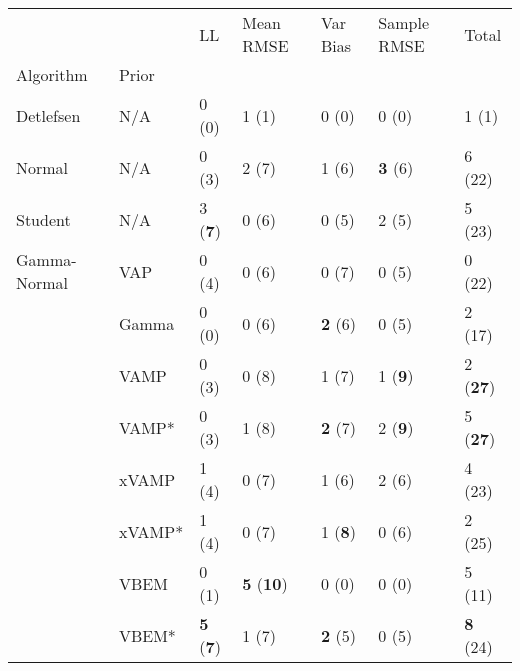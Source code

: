\begin{tabular}{lllllll}
\toprule
             &       &                       LL &                 Mean RMSE &        Var Bias &     Sample RMSE &            Total \\
Algorithm & Prior &                          &                           &                 &                 &                  \\
\midrule
Detlefsen & N/A &                    0 (0) &                     1 (1) &           0 (0) &           0 (0) &            1 (1) \\
Normal & N/A &                    0 (3) &                     2 (7) &           1 (6) &  \textbf{3} (6) &           6 (22) \\
Student & N/A &           3 (\textbf{7}) &                     0 (6) &           0 (5) &           2 (5) &           5 (23) \\
Gamma-Normal & VAP &                    0 (4) &                     0 (6) &           0 (7) &           0 (5) &           0 (22) \\
             & Gamma &                    0 (0) &                     0 (6) &  \textbf{2} (6) &           0 (5) &           2 (17) \\
             & VAMP &                    0 (3) &                     0 (8) &           1 (7) &  1 (\textbf{9}) &  2 (\textbf{27}) \\
             & VAMP* &                    0 (3) &                     1 (8) &  \textbf{2} (7) &  2 (\textbf{9}) &  5 (\textbf{27}) \\
             & xVAMP &                    1 (4) &                     0 (7) &           1 (6) &           2 (6) &           4 (23) \\
             & xVAMP* &                    1 (4) &                     0 (7) &  1 (\textbf{8}) &           0 (6) &           2 (25) \\
             & VBEM &                    0 (1) &  \textbf{5} (\textbf{10}) &           0 (0) &           0 (0) &           5 (11) \\
             & VBEM* &  \textbf{5} (\textbf{7}) &                     1 (7) &  \textbf{2} (5) &           0 (5) &  \textbf{8} (24) \\
\bottomrule
\end{tabular}

